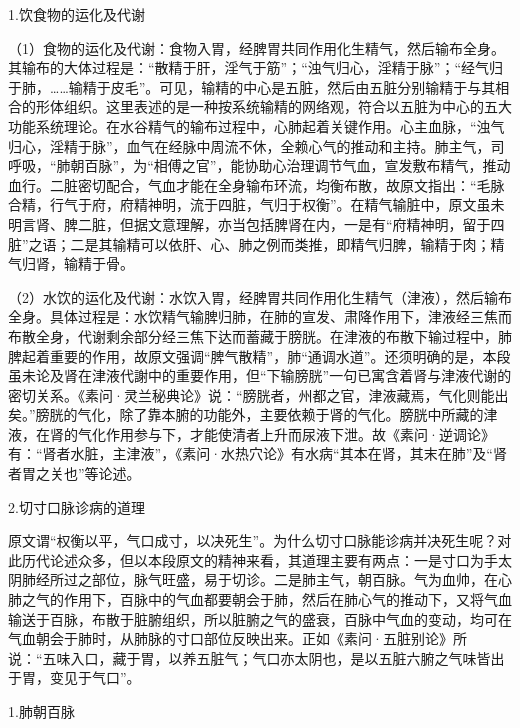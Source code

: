 \documentclass[12pt]{ctexbook}
\begin{document}

1.饮食物的运化及代谢

（1）食物的运化及代谢：食物入胃，经脾胃共同作用化生精气，然后输布全身。其输布的大体过程是：“散精于肝，淫气于筋”；“浊气归心，淫精于脉”；“经气归于肺，……输精于皮毛”。可见，输精的中心是五脏，然后由五脏分别输精于与其相合的形体组织。这里表述的是一种按系统输精的网络观，符合以五脏为中心的五大功能系统理论。在水谷精气的输布过程中，心肺起着关键作用。心主血脉，“浊气归心，淫精于脉”，血气在经脉中周流不休，全赖心气的推动和主持。肺主气，司呼吸，“肺朝百脉”，为“相傅之官”，能协助心治理调节气血，宣发敷布精气，推动血行。二脏密切配合，气血才能在全身输布环流，均衡布散，故原文指出：“毛脉合精，行气于府，府精神明，流于四脏，气归于权衡”。在精气输脏中，原文虽未明言肾、脾二脏，但据文意理解，亦当包括脾肾在内，一是有“府精神明，留于四脏”之语；二是其输精可以依肝、心、肺之例而类推，即精气归脾，输精于肉；精气归肾，输精于骨。

（2）水饮的运化及代谢：水饮入胃，经脾胃共同作用化生精气（津液），然后输布全身。具体过程是：水饮精气输脾归肺，在肺的宣发、肃降作用下，津液经三焦而布散全身，代谢剩余部分经三焦下达而蓄藏于膀胱。在津液的布散下输过程中，肺脾起着重要的作用，故原文强调“脾气散精”，肺“通调水道”。还须明确的是，本段虽未论及肾在津液代謝中的重要作用，但“下输膀胱”一句已寓含着肾与津液代谢的密切关系。《素问·灵兰秘典论》说：“膀胱者，州都之官，津液藏焉，气化则能出矣。”膀胱的气化，除了靠本腑的功能外，主要依赖于肾的气化。膀胱中所藏的津液，在肾的气化作用参与下，才能使清者上升而尿液下泄。故《素问·逆调论》有：“肾者水脏，主津液”，《素问·水热穴论》有水病“其本在肾，其末在肺”及“肾者胃之关也”等论述。

2.切寸口脉诊病的道理

原文谓“权衡以平，气口成寸，以决死生”。为什么切寸口脉能诊病并决死生呢？对此历代论述众多，但以本段原文的精神来看，其道理主要有两点：一是寸口为手太阴肺经所过之部位，脉气旺盛，易于切诊。二是肺主气，朝百脉。气为血帅，在心肺之气的作用下，百脉中的气血都要朝会于肺，然后在肺心气的推动下，又将气血输送于百脉，布散于脏腑组织，所以脏腑之气的盛衰，百脉中气血的变动，均可在气血朝会于肺时，从肺脉的寸口部位反映出来。正如《素问·五脏别论》所说：“五味入口，藏于胃，以养五脏气；气口亦太阴也，是以五脏六腑之气味皆出于胃，变见于气口”。


1.肺朝百脉
\end{document}
